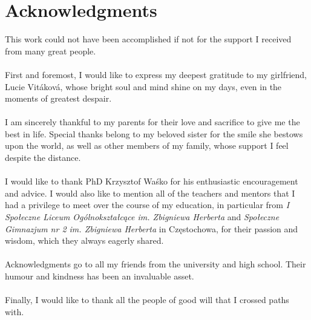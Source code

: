 \chapter*{Acknowledgments}
\thispagestyle{empty}
This work could not have been accomplished if not for the support I received from many great people.
\\\\
First and foremost, I would like to express my deepest gratitude to my girlfriend, Lucie Vitáková, whose bright soul and mind shine on my days, even in the moments of greatest despair.
\\\\
I am sincerely thankful to my parents for their love and sacrifice to give me the best in life. Special thanks belong to my beloved sister for the smile she bestows upon the world, as well as other members of my family, whose support I feel despite the distance.
\\\\
I would like to thank PhD Krzysztof Waśko for his enthusiastic encouragement and advice. I would also like to mention all of the teachers and mentors that I had a privilege to meet over the course of my education, in particular from \textit{I Społeczne Liceum Ogólnokształcące im. Zbigniewa Herberta} and \textit{Społeczne Gimnazjum nr 2 im. Zbigniewa Herberta} in Częstochowa, for their passion and wisdom, which they always eagerly shared.
\\\\
Acknowledgments go to all my friends from the university and high school. Their humour and kindness has been an invaluable asset.
\\\\
Finally, I would like to thank all the people of good will that I crossed paths with. 